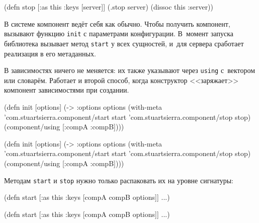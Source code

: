 \begin{english}
  \begin{clojure}
(defn stop
  [{:as this :keys [server]}]
  (.stop server)
  (dissoc this :server))
  \end{clojure}
\end{english}

В системе компонент ведёт себя как обычно. Чтобы получить компонент, вызывают
функцию \verb|init| с параметрами конфигурации. В~момент запуска библиотека
вызывает метод \verb|start| у всех сущностей, и~для сервера сработает реализация
в его метаданных.

В зависимостях ничего не меняется: их также указывают через \verb|using|
с~вектором или словарём. Работает и второй способ, когда конструктор
<<заряжает>> компонент зависимостями при создании.

\ifnarrow

\begin{english}
  \begin{clojure}
(defn init [options]
  (->
    {:options options}
    (with-meta
     {'com.stuartsierra.component/start
      start
      'com.stuartsierra.component/stop
      stop})
    (component/using [:compA :compB])))
  \end{clojure}
\end{english}

\else

\begin{english}
  \begin{clojure}
(defn init [options]
  (-> {:options options}
      (with-meta
        {'com.stuartsierra.component/start start
         'com.stuartsierra.component/stop stop})
      (component/using [:compA :compB])))
  \end{clojure}
\end{english}

\fi

\noindent
Методам \verb|start| и \verb|stop| нужно только распаковать их на уровне
сигнатуры:

\ifnarrow

\begin{english}
  \begin{clojure}
(defn start
  [{:as this
    :keys [compA compB options]}]
  ...)
  \end{clojure}
\end{english}

\else

\begin{english}
  \begin{clojure}
(defn start
  [{:as this :keys [compA compB options]}]
  ...)
  \end{clojure}
\end{english}

